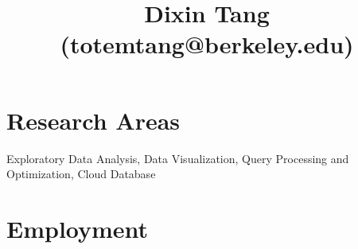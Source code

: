 \documentclass[10pt]{article} %
\begin{document}

\title{Dixin Tang {\small (totemtang@berkeley.edu)}} %

%
\vspace{-10mm}

\section{Research Areas}

Exploratory Data Analysis, Data Visualization, Query Processing and Optimization, Cloud Database

\vspace{-5mm}

\section{Employment}


\vspace{-7mm}
\end{document}
